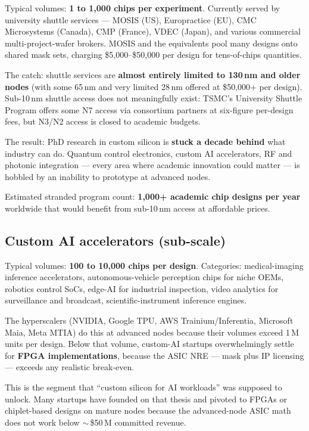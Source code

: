 \documentclass[11pt,letterpaper]{article}
\begin{document}
Typical volumes: \textbf{1 to 1{,}000 chips per experiment}. Currently served by university shuttle services --- MOSIS (US), Europractice (EU), CMC Microsystems (Canada), CMP (France), VDEC (Japan), and various commercial multi-project-wafer brokers. MOSIS and the equivalents pool many designs onto shared mask sets, charging \$5{,}000--\$50{,}000 per design for tens-of-chips quantities.

The catch: shuttle services are \textbf{almost entirely limited to 130\,nm and older nodes} (with some 65\,nm and very limited 28\,nm offered at \$50{,}000+ per design). Sub-10\,nm shuttle access does not meaningfully exist: TSMC's University Shuttle Program offers some N7 access via consortium partners at six-figure per-design fees, but N3/N2 access is closed to academic budgets.

The result: PhD research in custom silicon is \textbf{stuck a decade behind} what industry can do. Quantum control electronics, custom AI accelerators, RF and photonic integration --- every area where academic innovation could matter --- is hobbled by an inability to prototype at advanced nodes.

Estimated stranded program count: \textbf{1{,}000+ academic chip designs per year} worldwide that would benefit from sub-10\,nm access at affordable prices.

\subsection{Custom AI accelerators (sub-scale)}

Typical volumes: \textbf{100 to 10{,}000 chips per design}. Categories: medical-imaging inference accelerators, autonomous-vehicle perception chips for niche OEMs, robotics control SoCs, edge-AI for industrial inspection, video analytics for surveillance and broadcast, scientific-instrument inference engines.

The hyperscalers (NVIDIA, Google TPU, AWS Trainium/Inferentia, Microsoft Maia, Meta MTIA) do this at advanced nodes because their volumes exceed 1\,M units per design. Below that volume, custom-AI startups overwhelmingly settle for \textbf{FPGA implementations}, because the ASIC NRE --- mask plus IP licensing --- exceeds any realistic break-even.

This is the segment that ``custom silicon for AI workloads'' was supposed to unlock. Many startups have founded on that thesis and pivoted to FPGAs or chiplet-based designs on mature nodes because the advanced-node ASIC math does not work below $\sim$\,\$50\,M committed revenue.
\end{document}
